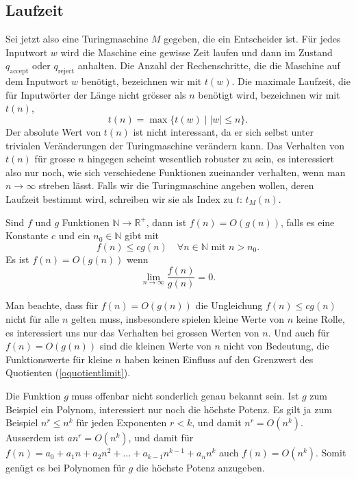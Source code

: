 \subsection{Laufzeit}
%
Sei jetzt also eine Turingmaschine $M$ gegeben, die ein Entscheider
ist. Für jedes Inputwort $w$ wird die Maschine eine gewisse Zeit
laufen und dann im Zustand $q_{\text{accept}}$ oder $q_{\text{reject}}$
anhalten. Die Anzahl der Rechenschritte, die die Maschine auf dem
Inputwort $w$ benötigt, bezeichnen wir mit $t(w)$.
Die maximale Laufzeit, die für Inputwörter der Länge nicht
grösser als $n$ benötigt wird, bezeichnen wir mit $t(n)$,
\[
t(n)=\max \{ t(w)\;|\; |w|\le n\}.
\]
Der absolute Wert von $t(n)$ ist nicht interessant, da er sich
selbst unter trivialen Veränderungen der Turingmaschine verändern
kann. Das Verhalten von $t(n)$ für grosse $n$ hingegen scheint
wesentlich robuster zu sein, es interessiert also nur noch, wie
sich verschiedene Funktionen zueinander verhalten, wenn man $n\to\infty$
streben lässt. Falls wir die Turingmaschine angeben wollen, deren
Laufzeit bestimmt wird, schreiben wir sie als Index zu $t$: $t_M(n)$.

\begin{definition}
Sind $f$ und $g$ Funktionen $\mathbb N\to\mathbb R^+$, dann ist
$f(n)=O(g(n))$, falls es eine Konstante $c$ und ein $n_0\in\mathbb N$
gibt mit
\[
f(n)\le cg(n)\quad \forall n\in\mathbb N\text{ mit } n > n_0.
\]
Es ist $f(n)=O(g(n))$ wenn 
\begin{equation}
\lim_{n\to\infty}\frac{f(n)}{g(n)}=0.
\label{oquotientlimit}
\end{equation}
\end{definition}
%
Man beachte, dass für $f(n)=O(g(n))$ die Ungleichung $f(n)\le
cg(n)$ nicht für alle $n$ gelten muss, insbesondere spielen kleine
Werte von $n$ keine Rolle, es interessiert uns nur das Verhalten
bei grossen Werten von $n$.
Und auch für $f(n)=O(g(n))$ sind die kleinen Werte von $n$ nicht
von Bedeutung, die Funktionswerte für kleine $n$ haben keinen
Einfluss auf den Grenzwert des Quotienten (\ref{oquotientlimit}).

Die Funktion $g$ muss offenbar nicht sonderlich genau bekannt
sein. Ist $g$ zum Beispiel ein Polynom, interessiert nur noch
die höchste Potenz. Es gilt ja zum Beispiel
$ n^r\le n^k $ für jeden Exponenten $r<k$, und damit
$n^r=O(n^k)$. Ausserdem ist $an^r=O(n^k)$, und damit
für $f(n)=a_0+a_1n+a_2n^2+\dots+a_{k-1}n^{k-1}+a_nn^k$ auch
$ f(n)=O(n^k) $. Somit genügt es bei Polynomen für $g$ die
höchste Potenz anzugeben.

